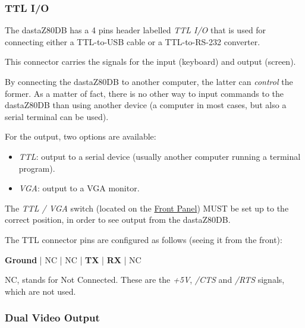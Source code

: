         \subsubsection{TTL I/O}
        \label{subsubsection:ttlio}

        The dastaZ80DB has a 4 pins header labelled \textit{TTL I/O} that is
        used for connecting either a TTL-to-USB cable or a TTL-to-RS-232
        converter.

        This connector carries the signals for the input (keyboard) and output
        (screen).

        By connecting the dastaZ80DB to another computer, the latter can
        \textit{control} the former. As a matter of fact, there is no other way
        to input commands to the dastaZ80DB than using another device (a
        computer in most cases, but also a serial terminal can be used).

        For the output, two options are available:

        \begin{itemize}
            \item \textit{TTL}: output to a serial device (usually another
                computer running a terminal program).
            \item \textit{VGA}: output to a VGA monitor.
        \end{itemize}

        The \textit{TTL / VGA} switch (located on the \hyperref[subsec:frontpanel]
        {Front Panel}) MUST be set up to the correct position, in order to see
        output from the dastaZ80DB.

        The TTL connector pins are configured as follows (seeing it from the
        front):

        \textbf{Ground} | NC | NC | \textbf{TX} | \textbf{RX} | NC

        NC, stands for Not Connected. These are the \textit{+5V}, \textit{/CTS}
        and \textit{/RTS} signals, which are not used.



        \subsubsection{Dual Video Output}

